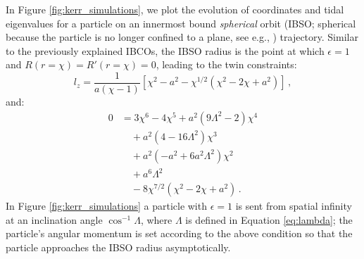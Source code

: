 \documentclass[
    reprint,
    prd,
    nofootinbib,
    amsmath,amssymb,
    aps,
    floatfix,
]{revtex4-2}
\begin{document}
In Figure \ref{fig:kerr_simulations}, we plot the evolution of coordinates and tidal eigenvalues for a particle on an innermost bound {\it spherical} orbit (IBSO; spherical because the particle is no longer confined to a plane, see e.g., \cite{Hod2013, Mummery2023}) trajectory. Similar to the previously explained IBCOs, the IBSO radius is the point at which $\epsilon = 1$ and $R(r = \chi) = R'(r = \chi) = 0$, leading to the twin constraints:
\begin{equation}
    l_{z} = \frac{1}{a(\chi - 1)} \left[ \chi^{2} - a^{2} - \chi^{1/2} \left( \chi^{2} - 2\chi + a^{2} \right) \right] \, ,
\end{equation}
and:
\begin{equation} \label{eq:ibso_kerr}
    \begin{split}
        0 &= 3\chi^{6} - 4 \chi^{5} + a^{2}(9\Lambda^{2} - 2) \chi^{4} \\
            &\quad+ a^{2} (4 - 16\Lambda^{2}) \chi^{3} \\
            &\quad+ a^{2} \left( -a^{2} + 6a^{2} \Lambda^{2} \right) \chi^{2} \\
            &\quad+ a^{6} \Lambda^{2} \\
            &\quad- 8 \chi^{7/2} \left( \chi^{2} - 2\chi + a^{2} \right) \, .
    \end{split}
\end{equation}
In Figure \ref{fig:kerr_simulations} a particle with $\epsilon = 1$ is sent from spatial infinity at an inclination angle $\cos^{-1}\Lambda$, where $\Lambda$ is defined in Equation \ref{eq:lambda}; the particle's angular momentum is set according to the above condition so that the particle approaches the IBSO radius asymptotically.
\end{document}
